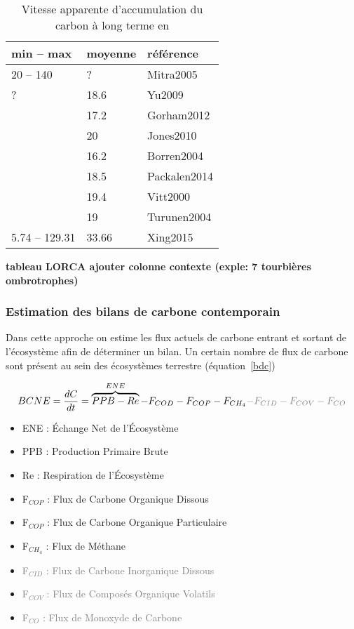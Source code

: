 \begin{table}
\centering
\caption{Vitesse apparente d'accumulation du carbon à long terme en \si{\gcms}}
\label{table:lorca}
\begin{tabular}{llp{7cm}}\toprule
min -- max & moyenne & référence \\ \midrule
20 -- 140  & ? & Mitra2005 \\ %
? & 18.6 &  Yu2009\\  %
 & 17.2 & Gorham2012 \\  %
 & 20 & Jones2010\\  %
 & 16.2 & Borren2004\\  %
 & 18.5 & Packalen2014\\ %
 & 19.4 & Vitt2000\\ %
 & 19 & Turunen2004\\ %
5.74 -- 129.31 & 33.66 & Xing2015\\
\bottomrule
\end{tabular}
\end{table}
\textbf{tableau LORCA ajouter colonne contexte (exple: 7 tourbières ombrotrophes)}

\subsubsection{Estimation des bilans de carbone contemporain}

Dans cette approche on estime les flux actuels de carbone entrant et sortant de l'écosystème afin de déterminer un bilan.
Un certain nombre de flux de carbone sont présent au sein des écosystèmes terrestre (équation~\eqref{bdc})

\begin{equation}
BCNE=\frac{dC}{dt}=\overbrace{PPB - Re}^{ENE}  - F_{COD} - F_{COP} - F_{CH_{4}} \textcolor{gray}{- F_{CID} - F_{COV} - F_{CO}}
\label{bdc}
\end{equation}

\begin{itemize}
\item ENE : Échange Net de l'Écosystème
\item PPB : Production Primaire Brute
\item Re : Respiration de l'Écosystème
\vspace*{.2cm}
\item F$_{COP}$ : Flux de Carbone Organique Dissous
\item F$_{COP}$ : Flux de Carbone Organique Particulaire
\item F$_{CH_{4}}$ : Flux de Méthane
\vspace*{.2cm}
\item \textcolor{gray}{F$_{CID}$ : Flux de Carbone Inorganique Dissous}
\item \textcolor{gray}{F$_{COV}$ : Flux de Composés Organique Volatils}
\item \textcolor{gray}{F$_{CO}$ : Flux de Monoxyde de Carbone}
\end{itemize}


